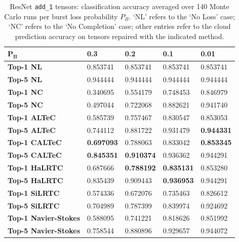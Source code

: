\documentclass[conference,letterpaper]{IEEEtran}
\begin{document}
\begin{table}[t]
\caption{ResNet \texttt{add\_1} tensors: classification accuracy averaged over 140 Monte Carlo runs per burst loss probability $P_B$. `NL' refers to the `No Loss' case; `NC' refers to the `No Completion' case; other entries refer to the cloud prediction accuracy on tensors repaired with the indicated method.}
\label{table:resnet18add1}
\begin{tabular}{|l|llll|}
\hline
$\mathbf{P_B}$                & \textbf{0.3}      & \textbf{0.2}      & \textbf{0.1}      & \textbf{0.01}     \\
\hline
\textbf{Top-1 NL}            & 0.853741 & 0.853741 & 0.853741 & 0.853741 \\
\textbf{Top-5 NL}            & 0.944444 & 0.944444 & 0.944444 & 0.944444 \\
\hline
\textbf{Top-1 NC}            & 0.340695 & 0.554179 & 0.748453 & 0.846979 \\
\textbf{Top-5 NC}            & 0.497044 & 0.722068 & 0.882621 & 0.941740 \\
\hline
\textbf{Top-1 ALTeC}         & 0.585739 & 0.757467 & 0.830547 & 0.853053 \\
\textbf{Top-5 ALTeC}         & 0.744112 & 0.881722 & 0.931479 & \textbf{0.944331} \\
\hline
\textbf{Top-1 CALTeC}        & \textbf{0.697093} & 0.788063 & 0.833042 & \textbf{0.853345} \\
\textbf{Top-5 CALTeC}        & \textbf{0.845351} & \textbf{0.910374} & 0.936362 & 0.944291 \\
\hline
\textbf{Top-1 HaLRTC}        & 0.687666 & \textbf{0.788192} & \textbf{0.835131} & 0.853280 \\
\textbf{Top-5 HaLRTC}        & 0.835439 & 0.909443 & \textbf{0.936953} & 0.944291 \\
\hline
\textbf{Top-1 SiLRTC}        & 0.574336 & 0.672076 & 0.735463 & 0.826612 \\
\textbf{Top-5 SiLRTC}        & 0.704989 & 0.787399 & 0.839974 & 0.924692 \\
\hline
\textbf{Top-1 Navier-Stokes} & 0.588095 & 0.741221 & 0.818626 & 0.851992 \\
\textbf{Top-5 Navier-Stokes} & 0.758544 & 0.880896 & 0.929657 & 0.944072\\
\hline
\end{tabular}
\end{table}
\end{document}
